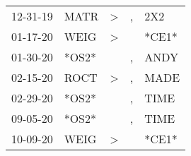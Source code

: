 \begin{supertabular}{p{0.07\textwidth}p{0.06\textwidth}p{0.02\textwidth}p{0.02\textwidth}p{0.06\textwidth}}
          12-31-19\textsuperscript{} &           MATR\textsuperscript{} &     \textgreater &                , &            2X2\textsuperscript{} \\
          01-17-20\textsuperscript{} &           WEIG\textsuperscript{} &     \textgreater &                  &                            *CE1* \\
          01-30-20\textsuperscript{} &                            *OS2* &                  &                , &           ANDY\textsuperscript{} \\
          02-15-20\textsuperscript{} &           ROCT\textsuperscript{} &     \textgreater &                , &           MADE\textsuperscript{} \\
          02-29-20\textsuperscript{} &                            *OS2* &                  &                , &           TIME\textsuperscript{} \\
          09-05-20\textsuperscript{} &                            *OS2* &                  &                , &           TIME\textsuperscript{} \\
          10-09-20\textsuperscript{} &           WEIG\textsuperscript{} &     \textgreater &                  &                            *CE1* \\
\end{supertabular}
